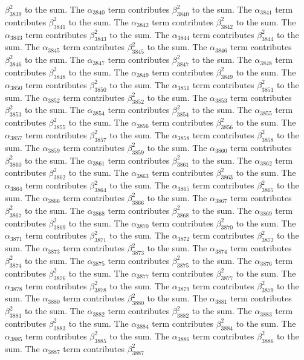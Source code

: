 \begin{lemma}
$\beta_{3839}^{2}$ to the sum. The $\alpha_{3840}$ term contributes $\beta_{3840}^{2}$ to the sum. The $\alpha_{3841}$ term contributes $\beta_{3841}^{2}$ to the sum. The $\alpha_{3842}$ term contributes $\beta_{3842}^{2}$ to the sum. The $\alpha_{3843}$ term contributes $\beta_{3843}^{2}$ to the sum. The $\alpha_{3844}$ term contributes $\beta_{3844}^{2}$ to the sum. The $\alpha_{3845}$ term contributes $\beta_{3845}^{2}$ to the sum. The $\alpha_{3846}$ term contributes $\beta_{3846}^{2}$ to the sum. The $\alpha_{3847}$ term contributes $\beta_{3847}^{2}$ to the sum. The $\alpha_{3848}$ term contributes $\beta_{3848}^{2}$ to the sum. The $\alpha_{3849}$ term contributes $\beta_{3849}^{2}$ to the sum. The $\alpha_{3850}$ term contributes $\beta_{3850}^{2}$ to the sum. The $\alpha_{3851}$ term contributes $\beta_{3851}^{2}$ to the sum. The $\alpha_{3852}$ term contributes $\beta_{3852}^{2}$ to the sum. The $\alpha_{3853}$ term contributes $\beta_{3853}^{2}$ to the sum. The $\alpha_{3854}$ term contributes $\beta_{3854}^{2}$ to the sum. The $\alpha_{3855}$ term contributes $\beta_{3855}^{2}$ to the sum. The $\alpha_{3856}$ term contributes $\beta_{3856}^{2}$ to the sum. The $\alpha_{3857}$ term contributes $\beta_{3857}^{2}$ to the sum. The $\alpha_{3858}$ term contributes $\beta_{3858}^{2}$ to the sum. The $\alpha_{3859}$ term contributes $\beta_{3859}^{2}$ to the sum. The $\alpha_{3860}$ term contributes $\beta_{3860}^{2}$ to the sum. The $\alpha_{3861}$ term contributes $\beta_{3861}^{2}$ to the sum. The $\alpha_{3862}$ term contributes $\beta_{3862}^{2}$ to the sum. The $\alpha_{3863}$ term contributes $\beta_{3863}^{2}$ to the sum. The $\alpha_{3864}$ term contributes $\beta_{3864}^{2}$ to the sum. The $\alpha_{3865}$ term contributes $\beta_{3865}^{2}$ to the sum. The $\alpha_{3866}$ term contributes $\beta_{3866}^{2}$ to the sum. The $\alpha_{3867}$ term contributes $\beta_{3867}^{2}$ to the sum. The $\alpha_{3868}$ term contributes $\beta_{3868}^{2}$ to the sum. The $\alpha_{3869}$ term contributes $\beta_{3869}^{2}$ to the sum. The $\alpha_{3870}$ term contributes $\beta_{3870}^{2}$ to the sum. The $\alpha_{3871}$ term contributes $\beta_{3871}^{2}$ to the sum. The $\alpha_{3872}$ term contributes $\beta_{3872}^{2}$ to the sum. The $\alpha_{3873}$ term contributes $\beta_{3873}^{2}$ to the sum. The $\alpha_{3874}$ term contributes $\beta_{3874}^{2}$ to the sum. The $\alpha_{3875}$ term contributes $\beta_{3875}^{2}$ to the sum. The $\alpha_{3876}$ term contributes $\beta_{3876}^{2}$ to the sum. The $\alpha_{3877}$ term contributes $\beta_{3877}^{2}$ to the sum. The $\alpha_{3878}$ term contributes $\beta_{3878}^{2}$ to the sum. The $\alpha_{3879}$ term contributes $\beta_{3879}^{2}$ to the sum. The $\alpha_{3880}$ term contributes $\beta_{3880}^{2}$ to the sum. The $\alpha_{3881}$ term contributes $\beta_{3881}^{2}$ to the sum. The $\alpha_{3882}$ term contributes $\beta_{3882}^{2}$ to the sum. The $\alpha_{3883}$ term contributes $\beta_{3883}^{2}$ to the sum. The $\alpha_{3884}$ term contributes $\beta_{3884}^{2}$ to the sum. The $\alpha_{3885}$ term contributes $\beta_{3885}^{2}$ to the sum. The $\alpha_{3886}$ term contributes $\beta_{3886}^{2}$ to the sum. The $\alpha_{3887}$ term contributes $\beta_{3887}^{2}$ 
\end{lemma}
